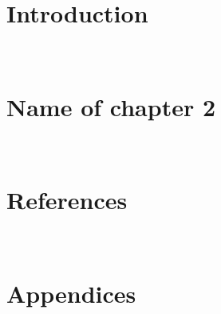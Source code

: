 \documentclass[11pt,a4paper]{report}
\begin{document}
\newpage \ \newpage


\setcounter{page}{1}

\chapter{Introduction}


\newpage \ \newpage

\chapter{Name of chapter 2}


\newpage \ \newpage

\newpage
{}
\chapter*{References}



\newpage \ \newpage

\newpage
{}
\chapter*{Appendices}

\end{document}
